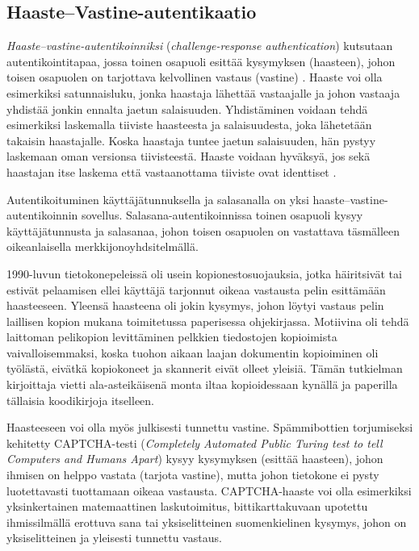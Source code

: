 \documentclass[finnish,gradu]{tktltiki}
\begin{document}
  \subsection{Haaste--Vastine-autentikaatio} %
  \label{sub:haaste_vastine_autentikaatio}

  \emph{Haaste--vastine-autentikoinniksi} (\emph{challenge-response authentication}) kutsutaan autentikointitapaa, jossa toinen osapuoli esittää kysymyksen (haasteen), johon toisen osapuolen on tarjottava kelvollinen vastaus (vastine) \cite{NIST_SP800-63}. Haaste voi olla esimerkiksi satunnaisluku, jonka haastaja lähettää vastaajalle ja johon vastaaja yhdistää jonkin ennalta jaetun salaisuuden. Yhdistäminen voidaan tehdä esimerkiksi laskemalla tiiviste haasteesta ja salaisuudesta, joka lähetetään takaisin haastajalle. Koska haastaja tuntee jaetun salaisuuden, hän pystyy laskemaan oman versionsa tiivisteestä. Haaste voidaan hyväksyä, jos sekä haastajan itse laskema että vastaanottama tiiviste ovat identtiset \cite{NIST_SP800-63}.

  Autentikoituminen käyttäjätunnuksella ja salasanalla on yksi haaste--vastine-autentikoinnin sovellus. Salasana-autentikoinnissa toinen osapuoli kysyy käyttäjätunnusta ja salasanaa, johon toisen osapuolen on vastattava täsmälleen oikeanlaisella merkkijonoyhdsitelmällä.

  1990-luvun tietokonepeleissä oli usein kopionestosuojauksia, jotka häiritsivät tai estivät pelaamisen ellei käyttäjä tarjonnut oikeaa vastausta pelin esittämään haasteeseen. Yleensä haasteena oli jokin kysymys, johon löytyi vastaus pelin laillisen kopion mukana toimitetussa paperisessa ohjekirjassa. Motiivina oli tehdä laittoman pelikopion levittäminen pelkkien tiedostojen kopioimista vaivalloisemmaksi, koska tuohon aikaan laajan dokumentin kopioiminen oli työlästä, eivätkä kopiokoneet ja skannerit eivät olleet yleisiä. Tämän tutkielman kirjoittaja vietti ala-asteikäisenä monta iltaa kopioidessaan kynällä ja paperilla tällaisia koodikirjoja itselleen.

  Haasteeseen voi olla myös julkisesti tunnettu vastine. Spämmibottien torjumiseksi kehitetty CAPTCHA-testi (\emph{Completely Automated Public Turing test to tell Computers and Humans Apart}) kysyy kysymyksen (esittää haasteen), johon ihmisen on helppo vastata (tarjota vastine), mutta johon tietokone ei pysty luotettavasti tuottamaan oikeaa vastausta. CAPTCHA-haaste voi olla esimerkiksi yksinkertainen matemaattinen laskutoimitus, bittikarttakuvaan upotettu ihmissilmällä erottuva sana tai yksiselitteinen suomenkielinen kysymys, johon on yksiselitteinen ja yleisesti tunnettu vastaus.
\end{document}
